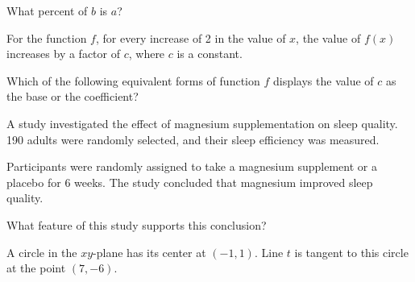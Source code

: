 What percent of \(b\) is \(a\)?

\vspace{0.75em}


\vspace{2em}
\newpage

\noindent\markforreview
\vspace{1em}

For the function \(f\), for every increase of 2 in the value of \(x\), the value of \(f(x)\) increases by a factor of \(c\), where \(c\) is a constant.

Which of the following equivalent forms of function \(f\) displays the value of \(c\) as the base or the coefficient?

\vspace{0.75em}


\vspace{2em}
\newpage

\noindent\markforreview
\vspace{1em}

A study investigated the effect of magnesium supplementation on sleep quality. 190 adults were randomly selected, and their sleep efficiency was measured.

Participants were randomly assigned to take a magnesium supplement or a placebo for 6 weeks. The study concluded that magnesium improved sleep quality.

What feature of this study supports this conclusion?

\vspace{0.75em}


\vspace{2em}
\newpage

\noindent\markforreview
\vspace{1em}

A circle in the \(xy\)-plane has its center at \((-1, 1)\). Line \(t\) is tangent to this circle at the point \((7, -6)\).

